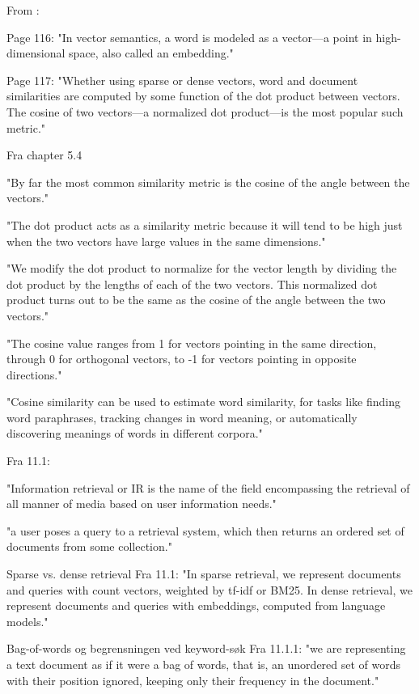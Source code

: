From \parencite{jurafsky_martin2026speech_language_processing} :

Page 116: 
"In vector semantics, a word is modeled as a vector—a point in high-dimensional space, also called an embedding."

Page 117:
"Whether using sparse or dense vectors, word and document similarities are computed by some function of the dot product between vectors. The cosine of two vectors—a normalized dot product—is the most popular such metric."

Fra chapter 5.4

"By far the most common similarity metric is the cosine of the angle between the vectors."

"The dot product acts as a similarity metric because it will tend to be high just when the two vectors have large values in the same dimensions."

"We modify the dot product to normalize for the vector length by dividing the dot product by the lengths of each of the two vectors. This normalized dot product turns out to be the same as the cosine of the angle between the two vectors."

"The cosine value ranges from 1 for vectors pointing in the same direction, through 0 for orthogonal vectors, to -1 for vectors pointing in opposite directions."

"Cosine similarity can be used to estimate word similarity, for tasks like finding word paraphrases, tracking changes in word meaning, or automatically discovering meanings of words in different corpora."

Fra 11.1:

"Information retrieval or IR is the name of the field encompassing the retrieval of all manner of media based on user information needs."

"a user poses a query to a retrieval system, which then returns an ordered set of documents from some collection."

Sparse vs. dense retrieval
Fra 11.1:
"In sparse retrieval, we represent documents and queries with count vectors, weighted by tf-idf or BM25. In dense retrieval, we represent documents and queries with embeddings, computed from language models."

Bag-of-words og begrensningen ved keyword-søk
Fra 11.1.1:
"we are representing a text document as if it were a bag of words, that is, an unordered set of words with their position ignored, keeping only their frequency in the document."


